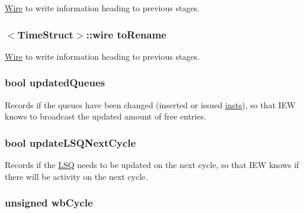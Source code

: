 \hyperlink{classWire}{Wire} to write information heading to previous stages. \hypertarget{classDefaultIEW_a0f41e335a1b036cd36ccec9716b2ee2b}{
\subsubsection[{toRename}]{$<${\bf TimeStruct}$>$::wire {\bf toRename}}}
\label{classDefaultIEW_a0f41e335a1b036cd36ccec9716b2ee2b}
\hyperlink{classWire}{Wire} to write information heading to previous stages. \hypertarget{classDefaultIEW_abdd12485100503d860c2aeda746cfd75}{
\subsubsection[{updatedQueues}]{\setlength{\rightskip}{0pt plus 5cm}bool {\bf updatedQueues}}}
\label{classDefaultIEW_abdd12485100503d860c2aeda746cfd75}
Records if the queues have been changed (inserted or issued \hyperlink{namespaceinsts}{insts}), so that IEW knows to broadcast the updated amount of free entries. \hypertarget{classDefaultIEW_a5cbd0281152001f7337f5d95155db5c0}{
\subsubsection[{updateLSQNextCycle}]{\setlength{\rightskip}{0pt plus 5cm}bool {\bf updateLSQNextCycle}}}
\label{classDefaultIEW_a5cbd0281152001f7337f5d95155db5c0}
Records if the \hyperlink{classLSQ}{LSQ} needs to be updated on the next cycle, so that IEW knows if there will be activity on the next cycle. \hypertarget{classDefaultIEW_ad2c7b2687f864f2b7359eb393276996f}{
\subsubsection[{wbCycle}]{\setlength{\rightskip}{0pt plus 5cm}unsigned {\bf wbCycle}}}
